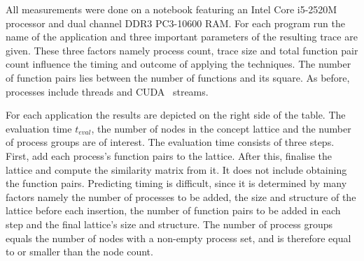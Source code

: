 \documentclass[a4paper, final, diplominf]{zih-template}
\begin{document}
All measurements were done on a notebook featuring an Intel Core i5-2520M processor and dual channel DDR3 PC3-10600 RAM.
For each program run the name of the application and three important parameters of the resulting trace are given.
These three factors namely process count, trace size and total function pair count influence the timing and outcome of applying the techniques.
The number of function pairs lies between the number of functions and its square.
As before, processes include threads and CUDA~\cite{cuda} streams.

For each application the results are depicted on the right side of the table.
The evaluation time $t_{eval}$, the number of nodes in the concept lattice and the number of process groups are of interest.
The evaluation time consists of three steps.
First, add each process's function pairs to the lattice.
After this, finalise the lattice and compute the similarity matrix from it.
It does not include obtaining the function pairs.
Predicting timing is difficult, since it is determined by many factors namely the number of processes to be added, the size and structure of the lattice before each insertion, the number of function pairs to be added in each step and the final lattice's size and structure.
The number of process groups equals the number of nodes with a non-empty process set, and is therefore equal to or smaller than the node count.
\end{document}
